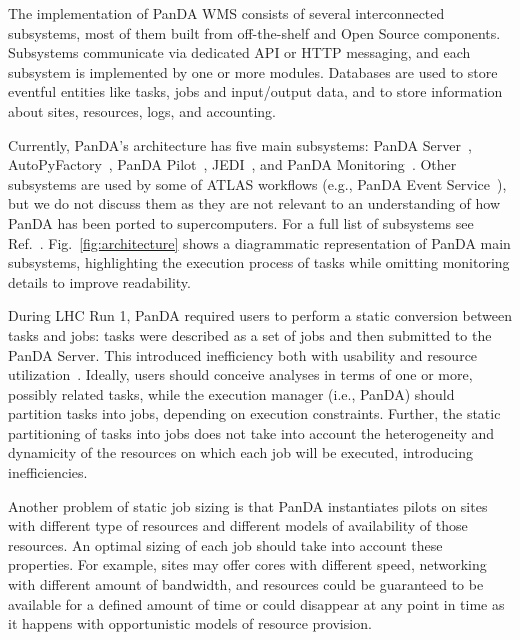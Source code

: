The implementation of PanDA WMS consists of several interconnected subsystems,
most of them built from off-the-shelf and Open Source components. Subsystems
communicate via dedicated API or HTTP messaging, and each subsystem is
implemented by one or more modules. Databases are used to store eventful
entities %
like tasks, jobs and  input/output data, and to store information about sites,
resources, logs, and accounting.

Currently, PanDA's architecture has five main subsystems: PanDA
Server~\cite{maeno2011overview},
AutoPyFactory~\cite{caballero2012autopyfactory}, PanDA
Pilot~\cite{nilsson2011atlas}, JEDI~\cite{borodin2015scaling}, and PanDA
Monitoring~\cite{klimentov2011atlas}. Other subsystems are used by some of ATLAS
workflows (e.g., PanDA Event Service~\cite{calafiura2015atlas}), but we do not
discuss them as they are  not relevant to an understanding of how PanDA has been
ported to supercomputers. For a full list of subsystems see
Ref.~\cite{panda-wiki_url}. Fig.~\ref{fig:architecture} shows a diagrammatic
representation of PanDA main subsystems, highlighting the execution process of
tasks while omitting monitoring details to improve readability.


During LHC Run 1, PanDA required users to perform a static conversion between
tasks and jobs: tasks were described as a set of jobs and then submitted to the
PanDA Server. This introduced inefficiency both with usability and resource
utilization~\cite{borodin2015unified}. Ideally, users should conceive analyses
in terms of one or more, possibly related tasks, while the execution manager
(i.e., PanDA) should partition tasks into jobs, depending on execution
constraints. Further, the static partitioning of tasks into jobs does not take
into account the heterogeneity and dynamicity of the resources on which each job
will be executed, introducing inefficiencies.

Another problem of static job sizing is that PanDA instantiates pilots on sites
with different type of resources and different models of availability of those
resources. An optimal sizing of each job should take into account these
properties. For example, sites may offer cores with different speed, networking
with different amount of bandwidth, and resources could be guaranteed to be
available for a defined amount of time or could disappear at any point in time
as it happens with opportunistic models of resource provision.


